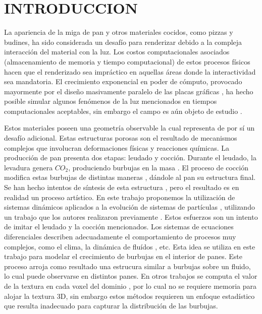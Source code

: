 \documentclass[oneside,a4paper,spanish,links]{amca}
\begin{document}
\section{INTRODUCCION}

La apariencia de la miga de pan y otros materiales cocidos, como pizzas y budines, ha sido considerada un desaf\'io para renderizar debido a la compleja interacci\'on del material con la luz. Los costos computacionales asociados (almacenamiento de memoria y tiempo computacional) de estos procesos f\'isicos hacen que el renderizado sea impr\'actico en aquellas áreas donde la interactividad sea mandatoria. El crecimiento exponencial en poder de c\'omputo, provocado mayormente por el dise\~no masivamente paralelo de las placas gr\'aficas \citep{Yeo09,Harris06}, ha hecho posible simular algunos fen\'omenos de la luz mencionados en tiempos computacionales aceptables, sin embargo el campo es a\'un objeto de estudio \citep{Voglsam2013}.

Estos materiales poseen una geometr\'ia observable la cual representa de por s\'i un desaf\'io adicional. Estas estructuras porosas son el resultado de mecanismos complejos que involucran deformaciones f\'isicas y reacciones qu\'imicas. La producci\'on de pan presenta dos etapas: leudado y cocci\'on. Durante el leudado, la levadura genera $CO_{2}$, produciendo burbujas en la masa \citep{Shah1998}. El proceso de cocci\'on \citep{Mondal2008} modifica estas burbujas de distintas maneras \citep{Scanlon2001}, d\'andole al pan su estructura final. Se han hecho intentos de s\'intesis de esta estructura \citep{Cho2007}, pero el resultado es en realidad un proceso art\'istico. En este trabajo proponemos la utilizaci\'on de sistemas din\'amicos \citep{Strogatz2001} aplicados a la evoluci\'on de sistemas de part\'iculas \citep{Reeves83}, utilizando un trabajo que los autores realizaron previamente \citep{Baravalle2011}. Estos esfuerzos son un intento de imitar el leudado y la cocci\'on mencionados. Los sistemas de ecuaciones diferenciales describen adecuadamente el comportamiento de procesos muy complejos, como el clima, la dinámica de fluídos \citep{Stam1999}, etc. Esta idea se utiliza en este trabajo para modelar el crecimiento de burbujas en el interior de panes. Este proceso arroja como resultado una estrucura similar a burbujas sobre un fluido, lo cual puede observarse en distintos panes. En otros trabajos se computa el valor de la textura en cada voxel del dominio \citep{Perlin1989}, por lo cual no se requiere memoria para alojar la textura 3D, sin embargo estos m\'etodos requieren un enfoque estad\'istico que resulta inadecuado para capturar la distribuci\'on de las burbujas.
\end{document}
